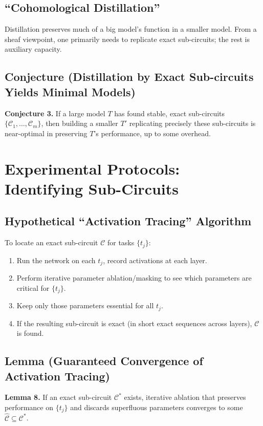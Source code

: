 \documentclass{article}
\begin{document}
\subsection{“Cohomological Distillation”}
Distillation preserves much of a big model’s function in a smaller model. From a sheaf viewpoint, one primarily needs to replicate exact sub-circuits; the rest is auxiliary capacity.

\subsection{Conjecture (Distillation by Exact Sub-circuits Yields Minimal Models)}
\textbf{Conjecture 3.}  
If a large model $T$ has found stable, exact sub-circuits $\{\mathcal{C}_1,\dots,\mathcal{C}_m\}$, then building a smaller $T'$ replicating precisely these sub-circuits is near-optimal in preserving $T$’s performance, up to some overhead.

\section{Experimental Protocols: Identifying Sub-Circuits}

\subsection{Hypothetical “Activation Tracing” Algorithm}
To locate an exact sub-circuit $\mathcal{C}$ for tasks $\{t_j\}$:
\begin{enumerate}
\item Run the network on each $t_j$, record activations at each layer.
\item Perform iterative parameter ablation/masking to see which parameters are critical for $\{t_j\}$.
\item Keep only those parameters essential for all $t_j$.
\item If the resulting sub-circuit is exact (in short exact sequences across layers), $\mathcal{C}$ is found.
\end{enumerate}

\subsection{Lemma (Guaranteed Convergence of Activation Tracing)}
\textbf{Lemma 8.}  
If an exact sub-circuit $\mathcal{C}^*$ exists, iterative ablation that preserves performance on $\{t_j\}$ and discards superfluous parameters converges to some $\widehat{\mathcal{C}} \subseteq \mathcal{C}^*$.
\end{document}
